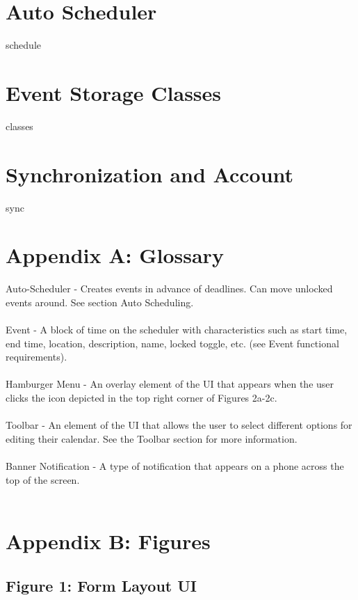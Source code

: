 \documentclass{scrreprt}
\begin{document}
\chapter{Auto Scheduler}

schedule

\chapter{Event Storage Classes}

classes

\chapter{Synchronization and Account}

sync

\chapter{Appendix A: Glossary}
Auto-Scheduler - Creates events in advance of deadlines. Can move unlocked events around. See section Auto Scheduling.\\
\\
Event - A block of time on the scheduler with characteristics such as start time, end time,
location, description, name, locked toggle, etc. (see Event functional requirements).\\
\\
Hamburger Menu - An overlay element of the UI that appears when the user clicks the icon depicted in the top right corner of Figures 2a-2c.\\
\\
Toolbar - An element of the UI that allows the user to select different options for editing their calendar.  See the Toolbar section for more information. \\
\\
Banner Notification - A type of notification that appears on a phone across the top of the screen. \\
\\
\chapter{Appendix B: Figures}

\section{Figure 1: Form Layout UI}
\end{document}
